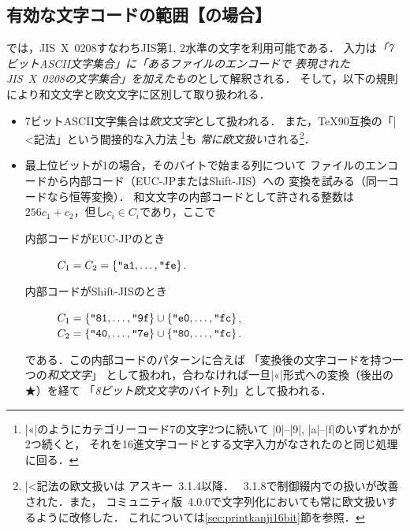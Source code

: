 \documentclass[a4paper,11pt,nomag,dvipdfmx]{jsarticle}
\begin{document}
\subsection{有効な文字コードの範囲【\pTeX の場合】}\label{sec:ptex_code}
\pTeX では，JIS~X~0208すなわちJIS第1, 2水準の文字を利用可能である．
入力は\emph{「7ビットASCII文字集合」に「あるファイルのエンコードで
表現されたJIS~X~0208の文字集合」を加えたもの}として解釈される．
そして，以下の規則により和文文字と欧文文字に区別して取り扱われる．
\begin{itemize}
 \item 7ビットASCII文字集合は\emph{欧文文字}として扱われる．
    また，\TeX90互換の「|^^|記法」という間接的な入力法
    \footnote{|^^ab|のようにカテゴリーコード7の文字2つに続いて
    |0|--|9|, |a|--|f|のいずれかが2つ続くと，
    それを16進文字コードとする文字入力がなされたのと同じ処理に回る．}も
    \emph{常に欧文扱い}される\footnote{|^^|記法の欧文扱いは
    アスキー\pTeX~3.1.4以降．
    \pTeX~3.1.8で制御綴内での扱いが改善された．また，
    コミュニティ版\pTeX~4.0.0で文字列化においても常に欧文扱いするように改修した．
    これについては\ref{sec:printkanji16bit}節を参照．}．
 \item 最上位ビットが1の場合，そのバイトで始まる列について
    ファイルのエンコードから内部コード（EUC-JPまたはShift-JIS）への
    変換を試みる（同一コードなら恒等変換）．
    和文文字の内部コードとして許される整数は
    $256c_1+c_2$，但し$c_i\in C_i$であり，ここで
  \begin{description}
   \item[内部コードがEUC-JPのとき]
    $C_1=C_2=\{\hex{a1},\dots,\hex{fe}\}$.
   \item[内部コードがShift-JISのとき]
    $C_1=\{\hex{81},\dots,\hex{9f}\}\cup\{\hex{e0},\dots,\hex{fc}\}$,\\
    $C_2=\{\hex{40},\dots,\hex{7e}\}\cup\{\hex{80},\dots,\hex{fc}\}$.
  \end{description}
    である．この内部コードのパターンに合えば
    「変換後の文字コードを持つ一つの\emph{和文文字}」
    として扱われ，合わなければ一旦|^^ab|形式への変換（後出の★）を経て
    「\emph{8ビット欧文文字}のバイト列」として扱われる．
\end{itemize}
\end{document}
